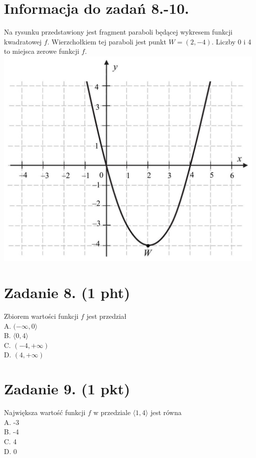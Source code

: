 \documentclass[10pt]{article}
\begin{document}
\section*{Informacja do zadań 8.-10.}
Na rysunku przedstawiony jest fragment paraboli będącej wykresem funkcji kwadratowej \(f\). Wierzchołkiem tej paraboli jest punkt \(W=(2,-4)\). Liczby 0 i 4 to miejsca zerowe funkcji \(f\).\\
\includegraphics[max width=\textwidth, center]{2024_11_21_d51d653f4fe4a5bb0c33g-04}

\section*{Zadanie 8. (1 pht)}
Zbiorem wartości funkcji \(f\) jest przedział\\
A. \((-\infty, 0\rangle\)\\
B. \(\langle 0,4\rangle\)\\
C. \((-4,+\infty)\)\\
D. \((4,+\infty)\)

\section*{Zadanie 9. (1 pkt)}
Największa wartość funkcji \(f\) w przedziale \(\langle 1,4\rangle\) jest równa\\
A. -3\\
B. -4\\
C. 4\\
D. 0
\end{document}

